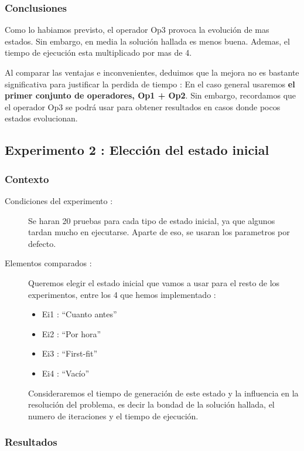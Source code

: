 \documentclass{article}
\begin{document}
\subsubsection{Conclusiones}

Como lo habiamos previsto, el operador Op3 provoca la evolución de mas estados.
Sin embargo, en media la solución hallada es menos buena. Ademas, el tiempo de
ejecución esta multiplicado por mas de 4.

Al comparar las ventajas e inconvenientes, deduimos que la mejora no es bastante
significativa para justificar la perdida de tiempo : En el caso general usaremos
\textbf{el primer conjunto de operadores, Op1 + Op2}. Sin embargo, recordamos
que el operador Op3 se podrá usar para obtener resultados en casos donde pocos
estados evolucionan.

\subsection{Experimento 2 : Elección del estado inicial}

\subsubsection{Contexto}

\begin{description}
\item[Condiciones del experimento :] Se haran 20 pruebas para cada tipo de
estado inicial, ya que algunos tardan mucho en ejecutarse. Aparte de eso, se
usaran los parametros por defecto.
\item[Elementos comparados :] Queremos elegir el estado inicial que vamos a usar
para el resto de los experimentos, entre los 4 que hemos implementado :
\begin{itemize}
\item Ei1 : ``Cuanto antes''
\item Ei2 : ``Por hora''
\item Ei3 : ``First-fit''
\item Ei4 : ``Vacío''
\end{itemize}

Consideraremos el tiempo de generación de este estado y la influencia en la
resolución del problema, es decir la bondad de la solución hallada, el numero de
iteraciones y el tiempo de ejecución.
\end{description}

\subsubsection{Resultados}
\end{document}
